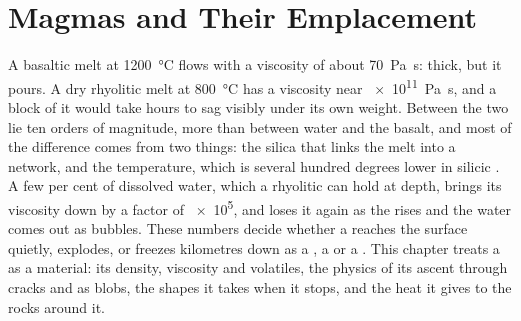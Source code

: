 \chapter{Magmas and Their Emplacement}\label{ch:b2:magma-emplacement}

A basaltic melt at \qty{1200}{\celsius} flows with a viscosity of about
\qty{70}{Pa.s}: thick, but it pours. A dry rhyolitic melt at \qty{800}{\celsius}
has a viscosity near \qty{e11}{Pa.s}, and a block of it would take hours to sag
visibly under its own weight. Between the two lie ten orders of magnitude, more
than between water and the basalt, and most of the difference comes from two
things: the silica that links the melt into a network, and the temperature,
which is several hundred degrees lower in silicic . A few per cent of
dissolved water, which a rhyolitic  can hold at depth, brings its viscosity
down by a factor of \num{e5}, and loses it again as the  rises and the
water comes out as bubbles. These numbers decide whether a  reaches the
surface quietly, explodes, or freezes kilometres down as a , a  or a
. This chapter treats a  as a material: its density, viscosity and
volatiles, the physics of its ascent through cracks and as blobs, the shapes it
takes when it stops, and the heat it gives to the rocks around it.

